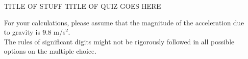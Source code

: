 \documentclass[addpoints]{exam}	 %
\begin{document}

TITLE OF STUFF \hfill TITLE OF QUIZ GOES HERE \\

\vspace{0.2in}


\vspace{0.1in}


\begin{center}
\gradetable[h][questions]
\end{center}
\noindent For your calculations, please assume that the magnitude of the acceleration due to gravity is 9.8 m/s$^2$.\\

\noindent The rules of significant digits might not be rigorously followed in all possible options on the multiple choice. 
\begin{questions}

\end{questions}
\end{document}
